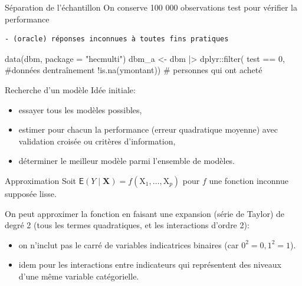 \documentclass[
  ignorenonframetext,
]{beamer}
\newenvironment{Shaded}{\begin{snugshade}}{\end{snugshade}}
\newcommand{\AttributeTok}[1]{\textcolor[rgb]{0.40,0.45,0.13}{#1}}
\newcommand{\CommentTok}[1]{\textcolor[rgb]{0.37,0.37,0.37}{#1}}
\newcommand{\DecValTok}[1]{\textcolor[rgb]{0.68,0.00,0.00}{#1}}
\newcommand{\FunctionTok}[1]{\textcolor[rgb]{0.28,0.35,0.67}{#1}}
\newcommand{\NormalTok}[1]{\textcolor[rgb]{0.00,0.23,0.31}{#1}}
\newcommand{\OtherTok}[1]{\textcolor[rgb]{0.00,0.23,0.31}{#1}}
\newcommand{\SpecialCharTok}[1]{\textcolor[rgb]{0.37,0.37,0.37}{#1}}
\newcommand{\StringTok}[1]{\textcolor[rgb]{0.13,0.47,0.30}{#1}}
\providecommand{\tightlist}{%
  \setlength{\itemsep}{0pt}\setlength{\parskip}{0pt}}\usepackage{longtable,booktabs,array}
\begin{document}
\begin{frame}[fragile]{Séparation de l'échantillon}
\protect\hypertarget{suxe9paration-de-luxe9chantillon}{}
On conserve 100 000 observations test pour vérifier la performance

\begin{verbatim}
- (oracle) réponses inconnues à toutes fins pratiques
\end{verbatim}

\footnotesize

\begin{Shaded}
\begin{Highlighting}[numbers=left,,]
\FunctionTok{data}\NormalTok{(dbm, }\AttributeTok{package =} \StringTok{"hecmulti"}\NormalTok{)}
\NormalTok{dbm\_a }\OtherTok{\textless{}{-}}\NormalTok{ dbm }\SpecialCharTok{|\textgreater{}}
\NormalTok{  dplyr}\SpecialCharTok{::}\FunctionTok{filter}\NormalTok{(}
\NormalTok{    test }\SpecialCharTok{==} \DecValTok{0}\NormalTok{, }\CommentTok{\#données d\textquotesingle{}entraînement}
    \SpecialCharTok{!}\FunctionTok{is.na}\NormalTok{(ymontant)) }\CommentTok{\# personnes qui ont acheté}
\end{Highlighting}
\end{Shaded}

\normalsize
\end{frame}

\begin{frame}{Recherche d'un modèle}
\protect\hypertarget{recherche-dun-moduxe8le}{}
Idée initiale:

\begin{itemize}
\tightlist
\item
  essayer tous les modèles possibles,
\item
  estimer pour chacun la performance (erreur quadratique moyenne) avec
  validation croisée ou critères d'information,
\item
  déterminer le meilleur modèle parmi l'ensemble de modèles.
\end{itemize}
\end{frame}

\begin{frame}{Approximation}
\protect\hypertarget{approximation}{}
Soit
\(\mathsf{E}(Y \mid \mathbf{X}) = f(\mathrm{X}_1, \ldots, \mathrm{X}_p)\)
pour \(f\) une fonction inconnue supposée lisse.

On peut approximer la fonction en faisant une expansion (série de
Taylor) de degré 2 (tous les termes quadratiques, et les interactions
d'ordre 2):

\begin{itemize}
\tightlist
\item
  on n'inclut pas le carré de variables indicatrices binaires (car
  \(0^2=0, 1^2=1\)).
\item
  idem pour les interactions entre indicateurs qui représentent des
  niveaux d'une même variable catégorielle.
\end{itemize}
\end{frame}
\end{document}
